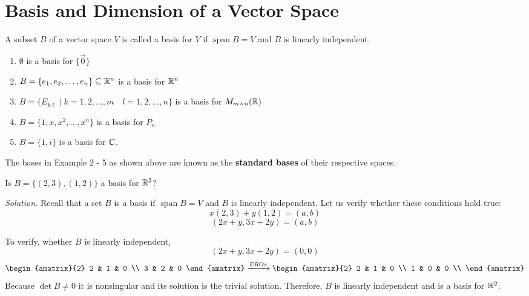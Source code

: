 \newpage
\section{Basis and Dimension of a Vector Space}
\begin{definition}
A subset $B$ of a vector space $V$ is called a basis for $V$ if $\operatorname{span}B = V$ and $B$ is linearly independent.
\end{definition}


\begin{example}
\leavevmode
\begin{enumerate}
    \item $\emptyset$ is a basis for $\{\vec{0}\}$
    \item $B = \{e_1, e_2, \dots, e_n\} \subseteq \mathbb{R}^n$ is a basis for $\mathbb{R}^n$
    \item $B = \{E_{k\ell} \mid k = 1, 2, \dots, m \quad l = 1, 2, \dots, n\}$ is a basis for $M_{m \times n}(\mathbb{R})$ 
    \item $B = \{1, x, x^2, \dots, x^n\}$ is a basis for $P_n$
    \item $B = \{1, i\}$ is a basis for $\mathbb{C}$.
\end{enumerate}
\end{example}

\begin{remark}
The bases in Example 2 - 5 as shown above are known as the \textbf{standard bases} of their respective spaces.
\end{remark}

\begin{example}
Is $B = \{(2, 3), (1, 2)\}$ a basis for $\mathbb{R}^2$?
\end{example}

\textit{Solution.} Recall that a set $B$ is a basis if $\operatorname{span} B = V$ and $B$ is linearly independent. Let us verify whether these conditions hold true:
$$x(2, 3) + y(1, 2) = (a, b)$$
$$(2x + y, 3x + 2y) = (a, b)$$

To verify, whether $B$ is linearly independent,
$$(2x + y, 3x + 2y) = (0, 0)$$
$$\begin{amatrix}{2}
    2 & 1 & 0 \\
    3 & 2 & 0
\end{amatrix} \xrightarrow{EROs}
\begin{amatrix}{2}
    2 & 1 & 0 \\ 
    1 & 0 & 0 \\
\end{amatrix}$$
Because $\det B \neq 0$ it is nonsingular and its solution is the trivial solution. Therefore, $B$ is linearly independent and is a basis for $\mathbb{R}^2$.

